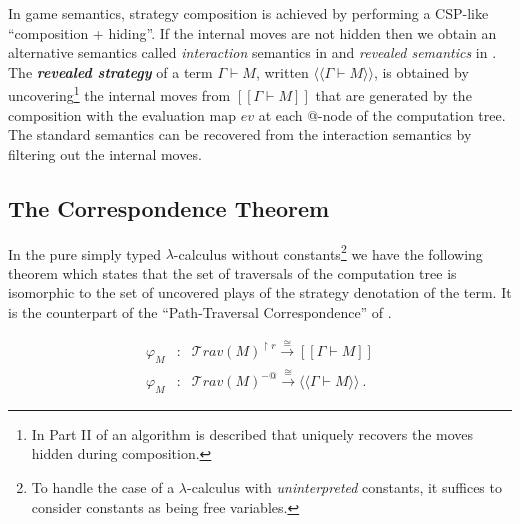 \documentclass{llncs}
\newcommand\defname[1]{{\bf\em #1}\index{#1}}
\newcommand\travset{\mathcal{T}rav}
\newcommand{\sem}[1]{{[\![ #1 ]\!]}}
\newcommand{\intersem}[1]{{\langle\!\langle #1 \rangle\!\rangle}}
\begin{document}
In game semantics, strategy composition is achieved by performing a
CSP-like ``composition + hiding''. If the internal moves are not hidden
then we obtain an alternative semantics called \emph{interaction}
semantics in \cite{DBLP:conf/sas/DimovskiGL05} and \emph{revealed
semantics} in \cite{willgreenlandthesis}.
The \defname{revealed strategy} of a term $\Gamma \vdash M$, written $\intersem{\Gamma \vdash M}$, is obtained by uncovering\footnote{In Part II of \cite{hylandong_pcf} an algorithm is described that
uniquely recovers the moves hidden during composition.} the
internal moves from $\sem{\Gamma \vdash M}$ that are generated by the composition with the evaluation map $ev$ at each @-node of the computation tree.
The standard semantics can be recovered from the interaction semantics by filtering out the internal moves.


\subsection{The Correspondence Theorem}

In the pure simply typed $\lambda$-calculus without constants\footnote{To handle the case of a $\lambda$-calculus with \emph{uninterpreted} constants, it suffices to
consider constants as being free variables.} we have the following theorem which
states that the set of traversals of the computation tree is isomorphic to the set of uncovered plays of the strategy
denotation of the term. It is the counterpart of the ``Path-Traversal Correspondence'' of \cite{OngLics2006}.
\begin{theorem}
\label{thm:correspondence}
\begin{eqnarray*}
 \varphi_M  &:& \travset(M)^{\upharpoonright r} \stackrel{\cong}{\longrightarrow} \sem{\Gamma \vdash M} \\
 \varphi_M  &:& \travset(M)^{-@} \stackrel{\cong}{\longrightarrow} \intersem{\Gamma \vdash M} \ .
\end{eqnarray*}
\end{theorem}
\end{document}
